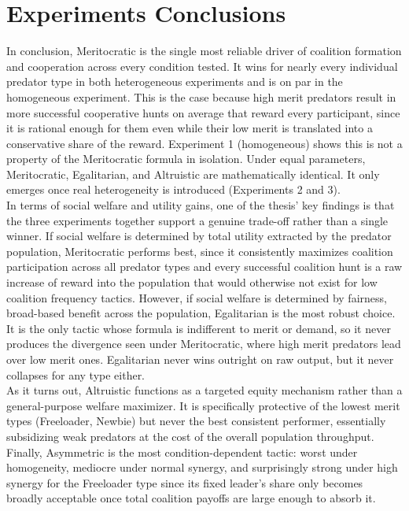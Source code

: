 \documentclass[12pt,a4paper]{report}
\begin{document}
	\section {Experiments Conclusions}
	
	In conclusion, Meritocratic is the single most reliable driver of coalition formation and cooperation across every condition tested. It wins for nearly every individual predator type in both heterogeneous experiments and is on par in the homogeneous experiment. This is the case because high merit predators result in more successful cooperative hunts on average that reward every participant, since it is rational enough for them even while their low merit is translated into a conservative share of the reward. Experiment 1 (homogeneous) shows this is not a property of the Meritocratic formula in isolation. Under equal parameters, Meritocratic, Egalitarian, and Altruistic are mathematically identical. It only emerges once real heterogeneity is introduced (Experiments 2 and 3). \\
	
	In terms of social welfare and utility gains, one of the thesis' key findings is that the three experiments together support a genuine trade-off rather than a single winner. If social welfare is determined by total utility extracted by the predator population, Meritocratic performs best, since it consistently maximizes coalition participation across all predator types and every successful coalition hunt is a raw increase of reward into the population that would otherwise not exist for low coalition frequency tactics. However, if social welfare is determined by fairness, broad-based benefit across the population, Egalitarian is the most robust choice. It is the only tactic whose formula is indifferent to merit or demand, so it never produces the divergence seen under Meritocratic, where high merit predators lead over low merit ones. Egalitarian never wins outright on raw output, but it never collapses for any type either. \\ 
	
	As it turns out, Altruistic functions as a targeted equity mechanism rather than a general-purpose welfare maximizer. It is specifically protective of the lowest merit types (Freeloader, Newbie) but never the best consistent performer, essentially subsidizing weak predators at the cost of the overall population throughput. Finally, Asymmetric is the most condition-dependent tactic: worst under homogeneity, mediocre under normal synergy, and surprisingly strong under high synergy for the Freeloader type since its fixed leader's share only becomes broadly acceptable once total coalition payoffs are large enough to absorb it. \\
	
\end{document}
